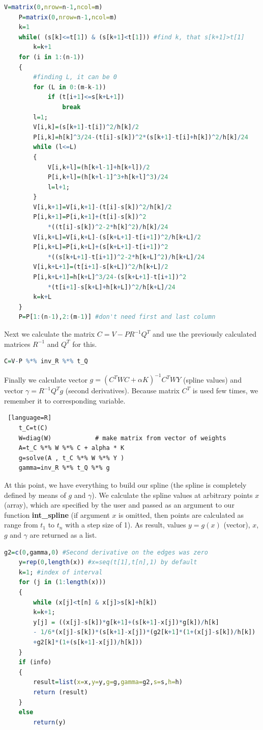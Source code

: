 \documentclass[a4paper,10pt]{article}
\begin{document}
%
\begin{lstlisting}[language=R]
	V=matrix(0,nrow=n-1,ncol=m)
	P=matrix(0,nrow=n-1,ncol=m)
	k=1
	while( (s[k]<=t[1]) & (s[k+1]<t[1])) #find k, that s[k+1]>t[1]
		k=k+1
	for (i in 1:(n-1))
	{
		#finding L, it can be 0
		for (L in 0:(m-k-1))
			if (t[i+1]<=s[k+L+1])
				break
		l=1;
		V[i,k]=(s[k+1]-t[i])^2/h[k]/2  
		P[i,k]=h[k]^3/24-(t[i]-s[k])^2*(s[k+1]-t[i]+h[k])^2/h[k]/24 
		while (l<=L)
		{
			V[i,k+l]=(h[k+l-1]+h[k+l])/2
			P[i,k+l]=(h[k+l-1]^3+h[k+l]^3)/24
			l=l+1;
		}
		V[i,k+1]=V[i,k+1]-(t[i]-s[k])^2/h[k]/2
		P[i,k+1]=P[i,k+1]+(t[i]-s[k])^2
			*((t[i]-s[k])^2-2*h[k]^2)/h[k]/24
		V[i,k+L]=V[i,k+L]-(s[k+L+1]-t[i+1])^2/h[k+L]/2
		P[i,k+L]=P[i,k+L]+(s[k+L+1]-t[i+1])^2
			*((s[k+L+1]-t[i+1])^2-2*h[k+L]^2)/h[k+L]/24    
		V[i,k+L+1]=(t[i+1]-s[k+L])^2/h[k+L]/2
		P[i,k+L+1]=h[k+L]^3/24-(s[k+L+1]-t[i+1])^2
			*(t[i+1]-s[k+L]+h[k+L])^2/h[k+L]/24
		k=k+L
	}
	P=P[1:(n-1),2:(m-1)] #don't need first and last column
\end{lstlisting}
%
Next we calculate the matrix $C=V-PR^{-1}Q^T$ and use the previously calculated matrices $R^{-1}$ and $Q^T$ for this.
%
\begin{lstlisting}[language=R]
	C=V-P %*% inv_R %*% t_Q
\end{lstlisting} 
%
Finally we calculate vector $g=\left(C^TWC+\alpha K\right)^{-1}C^TWY$ (spline values) and vector $\gamma=R^{-1}Q^Tg$ (second derivatives). 
Because matrix $C^T$ is used few times, we remember it to corresponding variable.
%
\begin{lstlisting} [language=R]
	t_C=t(C)
	W=diag(W)            # make matrix from vector of weights
	A=t_C %*% W %*% C + alpha * K
	g=solve(A , t_C %*% W %*% Y )
	gamma=inv_R %*% t_Q %*% g
\end{lstlisting} 
%
At this point, we have everything to build our spline (the spline is completely defined by means of $g$ and $\gamma$).
We calculate the spline values at arbitrary points $x$ (array), which are specified by the user and passed as an argument to our function \textbf{int\_spline} (if argument $x$ is omitted, then points are calculated as range from $t_1$ to $t_n$ with a step size of 1).
As result, values $y=g(x)$ (vector), $x$, $g$ and $\gamma$ are returned as a list.


%
\begin{lstlisting}[language=R]
	g2=c(0,gamma,0) #Second derivative on the edges was zero
	y=rep(0,length(x)) #x=seq(t[1],t[n],1) by default
	k=1; #index of interval 
	for (j in (1:length(x)))
	{
		while (x[j]<t[n] & x[j]>s[k]+h[k])
		k=k+1;
		y[j] = ((x[j]-s[k])*g[k+1]+(s[k+1]-x[j])*g[k])/h[k] 
		- 1/6*(x[j]-s[k])*(s[k+1]-x[j])*(g2[k+1]*(1+(x[j]-s[k])/h[k])
		+g2[k]*(1+(s[k+1]-x[j])/h[k]))
	}
	if (info)
	{
		result=list(x=x,y=y,g=g,gamma=g2,s=s,h=h)
		return (result)
	}
	else 
		return(y)
\end{lstlisting} 
\end{document}
